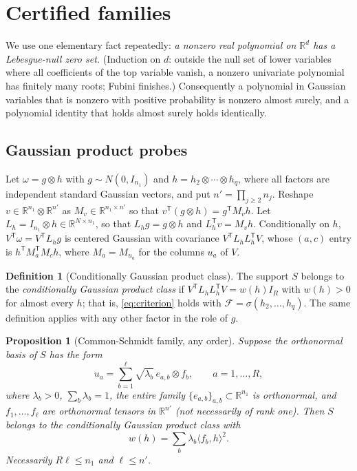 \documentclass[11pt,a4paper]{article}
\newtheorem{proposition}[theorem]{Proposition}
\theoremstyle{definition}
\newtheorem{definition}[theorem]{Definition}
\theoremstyle{remark}
\numberwithin{equation}{section}
\newcommand{\R}{\mathbb R}
\newcommand{\T}{{\mathsf T}}
\begin{document}
\section{Certified families}\label{sec:families}

We use one elementary fact repeatedly: \emph{a nonzero real polynomial on
$\R^d$ has a Lebesgue-null zero set.} (Induction on $d$: outside the null set
of lower variables where all coefficients of the top variable vanish, a
nonzero univariate polynomial has finitely many roots; Fubini finishes.)
Consequently a polynomial in Gaussian variables that is nonzero with
positive probability is nonzero almost surely, and a polynomial identity that
holds almost surely holds identically.

\subsection{Gaussian product probes}

Let $\omega=g\otimes h$ with $g\sim N(0,I_{n_1})$ and $h=h_2\otimes\cdots\otimes h_q$,
where all factors are independent standard Gaussian vectors, and put
$n'=\prod_{j\ge2}n_j$. Reshape $v\in\R^{n_1}\otimes\R^{n'}$ as
$M_v\in\R^{n_1\times n'}$ so that $v^\T(g\otimes h)=g^\T M_vh$. Let
$L_h=I_{n_1}\otimes h\in\R^{N\times n_1}$, so that $L_hg=g\otimes h$ and
$L_h^\T v=M_vh$. Conditionally on $h$, $V^\T\omega=V^\T L_hg$ is centered
Gaussian with covariance $V^\T L_hL_h^\T V$, whose $(a,c)$ entry is
$h^\T M_a^\T M_ch$, where $M_a=M_{u_a}$ for the columns $u_a$ of $V$.

\begin{definition}[Conditionally Gaussian product class]\label{def:cgp}
The support $S$ belongs to the \emph{conditionally Gaussian product class}
if $V^\T L_hL_h^\T V=w(h)I_R$ with $w(h)>0$ for almost every $h$; that is,
\eqref{eq:criterion} holds with $\mathcal F=\sigma(h_2,\ldots,h_q)$. The same
definition applies with any other factor in the role of $g$.
\end{definition}

\begin{proposition}[Common-Schmidt family, any order]\label{prop:schmidt}
Suppose the orthonormal basis of $S$ has the form
\begin{equation}\label{eq:schmidt}
 u_a=\sum_{b=1}^{\ell}\sqrt{\lambda_b}\,e_{a,b}\otimes f_b,\qquad a=1,\ldots,R,
\end{equation}
where $\lambda_b>0$, $\sum_b\lambda_b=1$, the \emph{entire} family
$\{e_{a,b}\}_{a,b}\subset\R^{n_1}$ is orthonormal, and $f_1,\ldots,f_\ell$ are
orthonormal tensors in $\R^{n'}$ (not necessarily of rank one). Then $S$
belongs to the conditionally Gaussian product class with
\begin{equation}\label{eq:wkr}
 w(h)=\sum_{b}\lambda_b\langle f_b,h\rangle^2 .
\end{equation}
Necessarily $R\ell\le n_1$ and $\ell\le n'$.
\end{proposition}
\end{document}
